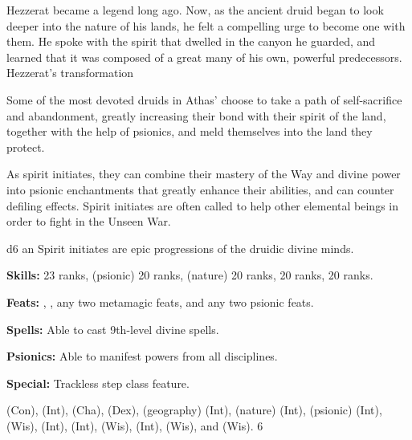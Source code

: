 {
Hezzerat became a legend long ago. Now, as the ancient druid began to look deeper into the nature of his lands, he felt a compelling urge to become one with them. He spoke with the spirit that dwelled in the canyon he guarded, and learned that it was composed of a great many of his own, powerful predecessors.
}{Hezzerat's transformation}
{
Some of the most devoted druids in Athas' choose to take a path of self-sacrifice and abandonment, greatly increasing their bond with their spirit of the land, together with the help of psionics, and meld themselves into the land they protect.

As spirit initiates, they can combine their mastery of the Way and divine power into psionic enchantments that greatly enhance their abilities, and can counter defiling effects. Spirit initiates are often called to help other elemental beings in order to fight in the Unseen War.
}
{d6}
{an}
{
Spirit initiates are epic progressions of the druidic divine minds.
}
{
\textbf{Skills:}  23 ranks,  (psionic) 20 ranks,  (nature) 20 ranks,  20 ranks,  20 ranks.

\textbf{Feats:} , , any two metamagic feats, and any two psionic feats.

\textbf{Spells:} Able to cast 9th-level divine spells.

\textbf{Psionics:} Able to manifest powers from all disciplines.

\textbf{Special:} Trackless step class feature.
}
{
 (Con),
 (Int),
 (Cha),
 (Dex),
 (geography) (Int),
 (nature) (Int),
 (psionic) (Int),
 (Wis),
 (Int),
 (Int),
 (Wis),
 (Int),
 (Wis),
and  (Wis).
}
{6}
{\WarriorTable[ll *{3}{Z{12mm}} L]}
